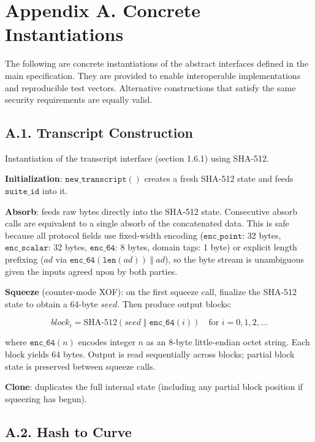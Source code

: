 \documentclass[
]{article}
\begin{document}
\section{Appendix A. Concrete
Instantiations}\label{appendix-a.-concrete-instantiations}

The following are concrete instantiations of the abstract interfaces
defined in the main specification. They are provided to enable
interoperable implementations and reproducible test vectors. Alternative
constructions that satisfy the same security requirements are equally
valid.

\subsection{A.1. Transcript
Construction}\label{a.1.-transcript-construction}

Instantiation of the transcript interface (section 1.6.1) using SHA-512.

\textbf{Initialization}: \(\texttt{new\_transcript}()\) creates a fresh
SHA-512 state and feeds \(\texttt{suite\_id}\) into it.

\textbf{Absorb}: feeds raw bytes directly into the SHA-512 state.
Consecutive absorb calls are equivalent to a single absorb of the
concatenated data. This is safe because all protocol fields use
fixed-width encoding (\(\texttt{enc\_point}\): 32 bytes,
\(\texttt{enc\_scalar}\): 32 bytes, \(\texttt{enc\_64}\): 8 bytes,
domain tags: 1 byte) or explicit length prefixing (\(ad\) via
\(\texttt{enc\_64}(\texttt{len}(ad)) \;\Vert\; ad\)), so the byte stream
is unambiguous given the inputs agreed upon by both parties.

\textbf{Squeeze} (counter-mode XOF): on the first squeeze call, finalize
the SHA-512 state to obtain a 64-byte \(seed\). Then produce output
blocks:

\[block_i = \text{SHA-512}(seed \;\Vert\; \texttt{enc\_64}(i)) \quad \text{for } i = 0, 1, 2, \ldots\]

where \(\texttt{enc\_64}(n)\) encodes integer \(n\) as an 8-byte
little-endian octet string. Each block yields 64 bytes. Output is read
sequentially across blocks; partial block state is preserved between
squeeze calls.

\textbf{Clone}: duplicates the full internal state (including any
partial block position if squeezing has begun).

\subsection{A.2. Hash to Curve}\label{a.2.-hash-to-curve}
\end{document}
